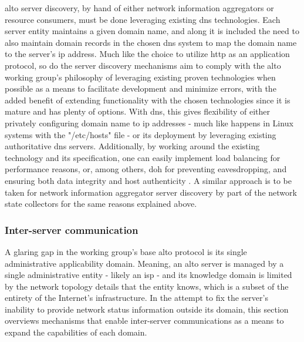     \gls{alto} server discovery, by hand of either network information aggregators or resource consumers, must be done leveraging existing \gls{dns} technologies.
    Each server entity maintains a given domain name, and along it is included the need to also maintain domain records in the chosen \gls{dns} system to map the domain name to the server's \gls{ip} address.
    Much like the choice to utilize \gls{http} as an application protocol, so do the server discovery mechanisms aim to comply with the \gls{alto} working group's philosophy of leveraging existing proven technologies when possible as a means to facilitate development and minimize errors, with the added benefit of extending functionality with the chosen technologies since it is mature and has plenty of options.
    With \gls{dns}, this gives flexibility of either privately configuring domain name to \gls{ip} addresses - much like happens in Linux systems with the "/etc/hosts" file - or its deployment by leveraging existing authoritative \gls{dns} servers.
    Additionally, by working around the existing technology and its specification, one can easily implement load balancing for performance reasons, or, among others, \gls{doh} for preventing eavesdropping, and ensuring both data integrity and host authenticity \cite{dns-https}.
    A similar approach is to be taken for network information aggregator server discovery by part of the network state collectors for the same reasons explained above.

\subsubsection{Inter-server communication}
\label{ssec:multi-alto}

    A glaring gap in the working group's base \gls{alto} protocol is its single administrative applicability domain.
    Meaning, an \gls{alto} server is managed by a single administrative entity - likely an \gls{isp} - and its knowledge domain is limited by the network topology details that the entity knows, which is a subset of the entirety of the Internet's infrastructure.
    In the attempt to fix the server's inability to provide network status information outside its domain, this section overviews mechanisms that enable inter-server communications as a means to expand the capabilities of each domain.

